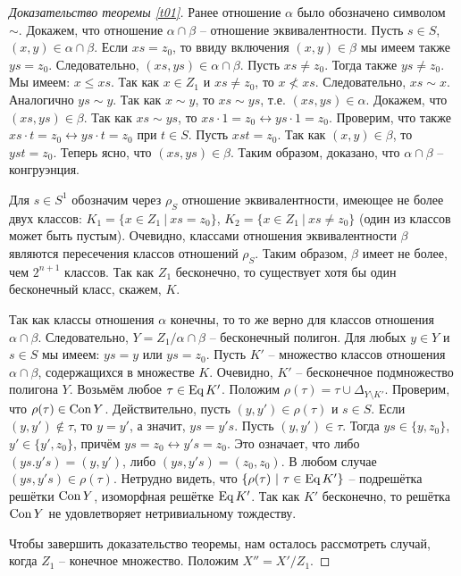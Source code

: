 \documentclass[a4paper]{article}
\newcommand{\Con}{\textnormal{Con}\, }
\newcommand{\Eq}{\textnormal{Eq}\, }
\begin{document}
\begin{proof}[Доказательство теоремы \ref{t01}]
		Ранее отношение $\alpha$ было обозначено символом $\sim$. Докажем, что отношение $\alpha \cap \beta$ -- отношение эквивалентности. Пусть $s \in S$, $(x,y) \in \alpha \cap \beta$. Если $xs = z_0$, то ввиду включения $(x,y) \in \beta$ мы имеем также $ys = z_0$. Следовательно, $(xs,ys) \in \alpha \cap \beta$. Пусть $xs \neq z_0$. Тогда также $ ys \neq z_0 $. Мы имеем: $x \leqslant xs$. Так как $x \in Z_1$ и $xs \neq z_0$, то $ x \not< xs $. Следовательно, $xs \sim x$. Аналогично $ys \sim y$. Так как $x \sim y$, то $xs \sim ys$, т.е. $(xs,ys) \in \alpha$. Докажем, что $(xs,ys) \in \beta$. Так как $xs \sim ys$, то $xs \cdot 1 = z_0 \leftrightarrow ys \cdot 1 = z_0$. Проверим, что также $xs \cdot t = z_0 \leftrightarrow ys \cdot t = z_0$ при $t \in S$. Пусть $xst = z_0$. Так как $(x,y) \in \beta$, то $yst = z_0$. Теперь ясно, что $(xs,ys) \in \beta$. Таким образом, доказано, что $\alpha \cap \beta$ -- конгруэнция.
		\par Для $s \in S^1$ обозначим через $\rho_S$ отношение эквивалентности, имеющее не более двух классов: $ K_1 = \{ x \in Z_1 \ |\ xs = z_0 \} $, $ K_2 = \{ x \in Z_1 \ |\ xs \neq z_0 \}$ (один из классов может быть пустым). Очевидно, классами отношения эквивалентности $\beta$ являются пересечения классов отношений $\rho_S$. Таким образом, $\beta$ имеет не более, чем $2^{n+1}$ классов. Так как $Z_1$ бесконечно, то существует хотя бы один бесконечный класс, скажем, $K$.
		\par Так как классы отношения $\alpha$ конечны, то то же верно для классов отношения $\alpha \cap \beta$. Следовательно, $Y = {Z_1}/{\alpha \cap \beta}$ -- бесконечный полигон. Для любых $y \in Y$ и $s \in S$ мы имеем: $ys = y$ или $ys = z_0$. Пусть $K'$ -- множество классов отношения $\alpha \cap \beta$, содержащихся в множестве $K$. Очевидно, $K'$ -- бесконечное подмножество полигона $Y$. Возьмём любое $\tau \in \Eq K'$. Положим $\rho(\tau) = \tau \cup \Delta_{Y \setminus K'}$. Проверим, что $\rho(\tau) \in \Con Y$. Действительно, пусть $(y,y') \in \rho(\tau)$ и $s \in S$. Если $(y,y') \notin \tau$, то $y = y'$, а значит, $ys = y's$. Пусть $(y,y') \in \tau$. Тогда $ys \in \{y,z_0\}$, $y' \in \{ y',z_0 \}$, причём $ys = z_0 \leftrightarrow y's = z_0$. Это означает, что либо $(ys.y's) = (y,y')$, либо $(ys,y's) = (z_0,z_0)$. В любом случае $(ys,y's) \in \rho(\tau)$. Нетрудно видеть, что $\{\rho(\tau) \ | \ \tau \in \Eq K' \}$ -- подрешётка решётки $\Con Y$, изоморфная решётке $\Eq K'$. Так как $K'$ бесконечно, то решётка $\Con Y$ не удовлетворяет нетривиальному тождеству.
		\par Чтобы завершить доказательство теоремы, нам осталось рассмотреть случай, когда $Z_1$ -- конечное множество. Положим $X'' = {X'}/{Z_1}$.

\end{proof}
\end{document}
